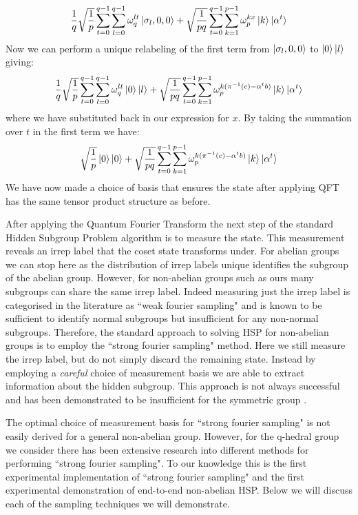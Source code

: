 \begin{equation}
     \frac{1}{q}\sqrt{\frac{1}{p}}\sum_{t=0}^{q-1}  \sum_{l=0}^{q-1}\omega^{lt}_q\ket{\sigma_l,0,0} +  \sqrt{\frac{1}{pq}}\sum_{t=0}^{q-1} \sum_{k=1}^{p-1} \omega_p^{k x}\ket{k}\ket{\alpha^t}
\end{equation}
Now we can perform a unique relabeling of the first term from $\ket{\sigma_l,0,0}$ to $\ket{0}\ket{l}$ giving:
\begin{equation}
     \frac{1}{q}\sqrt{\frac{1}{p}}\sum_{t=0}^{q-1}  \sum_{l=0}^{q-1}\omega^{lt}_q\ket{0}\ket{l} +  \sqrt{\frac{1}{pq}}\sum_{t=0}^{q-1} \sum_{k=1}^{p-1} \omega_p^{k (\pi^{-1}(c) - \alpha^tb)}\ket{k}\ket{\alpha^t}
\end{equation}
where we have substituted back in our expression for $x$. By taking the summation over $t$ in the first term we have:
\begin{equation}
     \sqrt{\frac{1}{p}} \ket{0}\ket{0} +  \sqrt{\frac{1}{pq}}\sum_{t=0}^{q-1} \sum_{k=1}^{p-1} \omega_p^{k (\pi^{-1}(c) - \alpha^tb)}\ket{k}\ket{\alpha^t}
     \label{eq:finalqftstate}
\end{equation}
We have now made a choice of basis that ensures the state after applying QFT has the same tensor product structure as before. 

After applying the Quantum Fourier Transform the next step of the standard Hidden Subgroup Problem algorithm is to measure the state. This measurement reveals an irrep label that the coset state transforms under. For abelian groups we can stop here as the distribution of irrep labels unique identifies the subgroup of the abelian group. However, for non-abelian groups such as ours many subgroups can share the same irrep label. Indeed measuring just the irrep label is categorised in the literature as ``weak fourier sampling" and is known to be sufficient to identify normal subgroups but insufficient for any non-normal subgroups. Therefore, the standard approach to solving HSP for non-abelian groups is to employ the ``strong fourier sampling" method. Here we still measure the irrep label, but do not simply discard the remaining state. Instead by employing a \emph{careful} choice of measurement basis we are able to extract information about the hidden subgroup. This approach is not always successful and has been demonstrated to be insufficient for the symmetric group \cite{moore2008symmetric}.

The optimal choice of measurement basis for ``strong fourier sampling" is not easily derived for a general non-abelian group. However, for the q-hedral group we consider there has been extensive research into different methods for performing ``strong fourier sampling".  To our knowledge this is the first experimental implementation of ``strong fourier sampling" and the first experimental demonstration of end-to-end non-abelian HSP. Below we will discuss each of the sampling techniques we will demonstrate.


